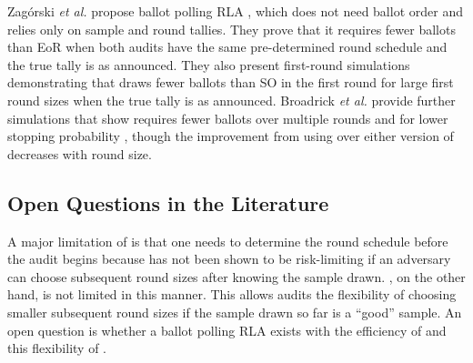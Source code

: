 Zag\'{o}rski {\em et al.} propose ballot polling RLA \Minerva \cite{usenix_minerva}, which does not need ballot order and relies only on sample and round tallies. They prove that it requires fewer ballots than EoR \BRAVO when both audits have the same pre-determined round schedule and the true tally is as announced. 
They also present first-round simulations demonstrating that \Minerva draws fewer ballots than SO \BRAVO in the first round for large first round sizes when the true tally is as announced. 
Broadrick {\em et al.} provide further simulations that show \Minerva requires fewer ballots over multiple rounds and for lower stopping probability \cite{simulations}, though the improvement from using \Minerva over either version of \BRAVO decreases with round size. 

\subsection{Open Questions in the Literature}
A major limitation of \Minerva is that one needs to determine the round schedule before the audit begins because \Minerva has not been shown to be risk-limiting if an adversary can choose subsequent round sizes after knowing the sample drawn. \BRAVO, on the other hand, is not limited in this manner. This allows \BRAVO audits the flexibility of choosing smaller subsequent round sizes if the sample drawn so far is a ``good'' sample. An open question is whether a ballot polling RLA exists with the efficiency of \Minerva and this flexibility of \BRAVO.

